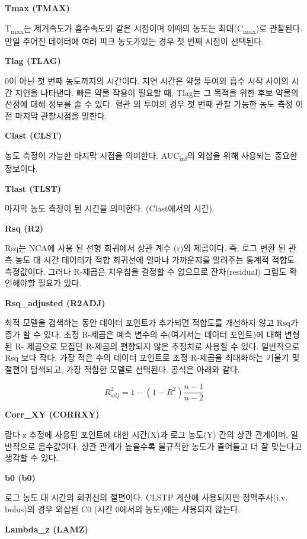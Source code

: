 \documentclass[
  11pt,
  krantz2, a4paper, twoside]{krantz}
\theoremstyle{definition}
\theoremstyle{definition}
\theoremstyle{definition}
\theoremstyle{definition}
\theoremstyle{remark}
\begin{document}
\textbf{Tmax (TMAX)}

T\textsubscript{max}는 제거속도가 흡수속도와 같은 시점이며 이때의 농도는 최대(C\textsubscript{max})로 관찰된다. 만일 주어진 데이터에 여러 피크 농도가있는 경우 첫 번째 시점이 선택된다.

\textbf{Tlag (TLAG)}

0이 아닌 첫 번째 농도까지의 시간이다. 지연 시간은 약물 투여와 흡수 시작 사이의 시간 지연을 나타낸다. 빠른 약물 작용이 필요할 때, Tlag는 그 목적을 위한 후보 약물의 선정에 대해 정보를 줄 수 있다. 혈관 외 투여의 경우 첫 번째 관찰 가능한 농도 측정 이전 마지막 관찰시점을 말한다.

\textbf{Clast (CLST)}

농도 측정이 가능한 마지막 시점을 의미한다. AUC\textsubscript{inf}의 외삽을 위해 사용되는 중요한 정보이다.

\textbf{Tlast (TLST)}

마지막 농도 측정이 된 시간을 의미한다. (Clast에서의 시간).

\textbf{Rsq (R2)}

Rsq는 NCA에 사용 된 선형 회귀에서 상관 계수 (r)의 제곱이다. 즉, 로그 변환 된 관측 농도 대 시간 데이터가 적합 회귀선에 얼마나 가까운지를 알려주는 통계적 적합도 측정값이다. 그러나 R-제곱은 치우침을 결정할 수 없으므로 잔차(residual) 그림도 확인해야할 필요가 있다.

\textbf{Rsq\_adjusted (R2ADJ)}

최적 모델을 검색하는 동안 데이터 포인트가 추가되면 적합도를 개선하지 않고 Rsq가 증가 할 수 있다. 조정 R-제곱은 예측 변수의 수(여기서는 데이터 포인트)에 대해 변형된 R- 제곱으로 모집단 R-제곱의 편향되지 않은 추정치로 사용할 수 있다. 일반적으로 Rsq 보다 작다. 가장 적은 수의 데이터 포인트로 조정 R-제곱을 최대화하는 기울기 및 절편이 탐색되고, 가장 적합한 모델로 선택된다. 공식은 아래와 같다.

\[R_{adj}^{2} = 1 - (1 - R^{2})\frac{n - 1}{n - 2}\]

\textbf{Corr\_XY (CORRXY)}

람다 z 추정에 사용된 포인트에 대한 시간(X)과 로그 농도(Y) 간의 상관 관계이며, 일반적으로 음수값이다. 상관 관계가 높을수록 불규칙한 농도가 줄어들고 더 잘 맞는다고 생각할 수 있다.

\textbf{b0 (b0)}

로그 농도 대 시간의 회귀선의 절편이다. CLSTP 계산에 사용되지만 정맥주사(i.v. bolus)의 경우 외삽된 C0 (시간 0에서의 농도)에는 사용되지 않는다.

\textbf{Lambda\_z (LAMZ)}
\end{document}

